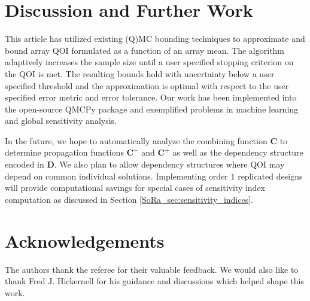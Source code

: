 \documentclass[graybox]{svmult}
\begin{document}
\section{Discussion and Further Work} \label{SoRa_sec:conclusions}

This article has utilized existing (Q)MC bounding techniques to approximate and bound array QOI formulated as a function of an array mean. The algorithm adaptively increases the sample size until a user specified stopping criterion on the QOI is met. The resulting bounds hold with uncertainty below a user specified threshold and the approximation is optimal with respect to the user specified error metric and error tolerance. Our work has been implemented into the open-source QMCPy package and exemplified problems in machine learning and global sensitivity analysis. 

In the future, we hope to automatically analyze the combining function $\boldsymbol{C}$ to determine propagation functions $\boldsymbol{C}^-$ and $\boldsymbol{C}^+$ as well as the dependency structure encoded in $\boldsymbol{D}$. We also plan to allow dependency structures where QOI may depend on common individual solutions. Implementing order $1$ replicated designs will provide computational savings for special cases of sensitivity index computation as discussed in Section \ref{SoRa_sec:sensitivity_indices}. 

\section*{Acknowledgements}

The authors thank the referee for their valuable feedback. We would also like to thank Fred J. Hickernell for his guidance and discussions which helped shape this work. 

% 
% 
\end{document}
